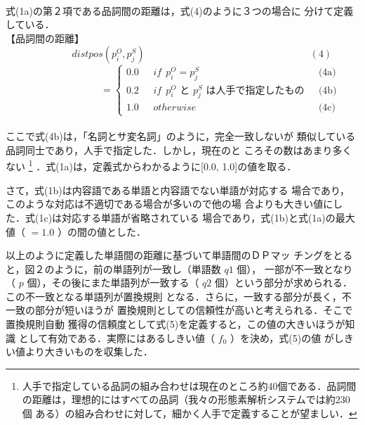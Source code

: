 \vspace{8mm}\\
式(1a)の第２項である品詞間の距離は，式(4)のように３つの場合に
分けて定義している．
\vspace{8mm}\\
【品詞間の距離】
$$ \ \ \ \ \ \ \ \ \ \ \ \ \ \ \ \ \ \ distpos(p^O_i, p^S_j) 
\ \ \ \ \ \ \ \ \ \ \ \ \ \ \ \ \ \ \ \ \ \ 
 \ \ \ \ \ \ \ \ \ \ \ \ \ \ \ \ \ \ \ \ \ \ \ \ \ \ \ \ \ \ \ \ \ \ \ \ \ \ \ \ \ \ \ \ \ \ \ \ \ \ \ \ \ \ (4) $$
\[ \ \ \ \ \ \ \ \ \ \ \ \ \ \ \ \ \ \ \ \ \ \ \ \ \ \ \ \ \ \ \ \ \ \ \ = \left\{ \begin{array}{llr}
        0.0 & \mbox{ $if \ \ p^O_i=p^S_j$ }
            & \mbox{ \ \ \ \ \ \ \ \ \ \ \ \ \ \ \ \ \ \ \ \ \ \ \ \ (4a)} \\
        0.2 & \mbox{ $if \ \ p^O_i$ と $p^S_j$ は人手で指定したもの }
            & \mbox{ \ \ \ \ \ \ \ \ \ \ \ \ \ \ \ \ \ \ \ \ \ \ \ \ (4b)} \\
        1.0 & \mbox{ $otherwise$ }
            & \mbox{ \ \ \ \ \ \ \ \ \ \ \ \ \ \ \ \ \ \ \ \ \ \ \ \ (4c)}
          \end{array}
  \right. \]
\vspace{8mm}\\
ここで式(4b)は，「名詞とサ変名詞」のように，完全一致しないが
類似している品詞同士であり，人手で指定した．しかし，現在のと
ころその数はあまり多くない
\footnote{
人手で指定している品詞の組み合わせは現在のところ約40個である．品詞間
の距離は，理想的にはすべての品詞（我々の形態素解析システムでは約230個
ある）の組み合わせに対して，細かく人手で定義することが望ましい．
}
．式(1a)は，定義式からわかるように[0.0, 1.0]の値を取る．

さて，式(1b)は内容語である単語と内容語でない単語が対応する
場合であり，このような対応は不適切である場合が多いので他の場
合よりも大きい値にした．式(1c)は対応する単語が省略されている
場合であり，式(1b)と式(1a)の最大値（ $= 1.0$ ）の間の値とした．

以上のように定義した単語間の距離に基づいて単語間のＤＰマッ
チングをとると，図２のように，前の単語列が一致し（単語数 $q1$ 個），
一部が不一致となり（ $p$ 個），その後にまた単語\mbox{列が一致する}（ $q2$ 
個）という部分が求められる．この不一致となる単語列が置換規則
となる．さらに，一致する部分が長く，不一致の部分が短いほうが
置換規則としての信頼性が高いと考えられる．そこで置換規則自動
獲得の信頼度として式(5)を定義すると，この値の大きいほうが知識
として有効である．実際にはあるしきい値（ $f_0$ ）を決め，式(5)の値
がしきい値より大きいものを収集した．
\vspace{8mm}\\

